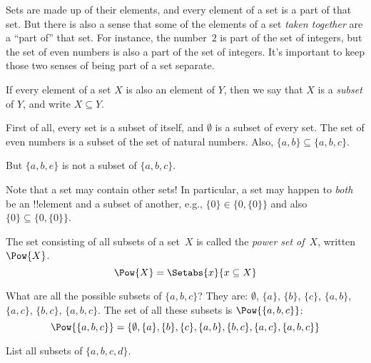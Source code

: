 \documentclass[../../include/open-logic-section]{subfiles}
\begin{document}

\begin{explain}
Sets are made up of their elements, and every element of a set is a
part of that set.  But there is also a sense that some of the elements
of a set \emph{taken together} are a ``part of'' that set. For
instance, the number~$2$ is part of the set of integers, but the set
of even numbers is also a part of the set of integers. It's important
to keep those two senses of being part of a set separate.
\end{explain}

\begin{defn}
If every element of a set $X$ is also an element of
    $Y$, then we say that $X$ is a \emph{subset} of $Y$, and write $X
    \subseteq Y$.
\end{defn}

\begin{ex}
First of all, every set is a subset of itself, and $\emptyset$ is a
subset of every set. The set of even numbers is a subset of the set of
natural numbers.  Also, $\{ a, b \} \subseteq \{ a, b, c \}$.

But $\{ a, b, e \}$ is not a subset of $\{ a, b, c \}$.
\end{ex}

\begin{explain}
Note that a set may contain other sets! In particular, a set may
happen to \emph{both} be an !!{element} and a subset of another, e.g.,
$\{0\} \in \{0, \{0\}\}$ and also $\{0\} \subseteq \{0, \{0\}\}$.
\end{explain}


\begin{defn}
The set consisting of all subsets of a set~$X$ is called the
\emph{power set of}~$X$, written $\Pow{X}$.
    \[\Pow{X} = \Setabs{x}{x \subseteq X} \]
\end{defn}

\begin{ex}
What are all the possible subsets of $\{ a, b, c \}$? They are:
$\emptyset$, $\{a \}$, $\{b\}$, $\{c\}$, $\{a, b\}$, $\{a, c\}$, $\{b,
c\}$, $\{a, b, c\}$.  The set of all these subsets is
$\Pow{\{a,b,c\}}$:
\[
\Pow{\{ a, b, c \}} = \{\emptyset, \{a \}, \{b\}, \{c\}, \{a, b\},
\{b, c\}, \{a, c\}, \{a, b, c\}\}
\]
\end{ex}

\begin{prob}
List all subsets of $\{a, b, c, d\}$.
\end{prob}
\end{document}

